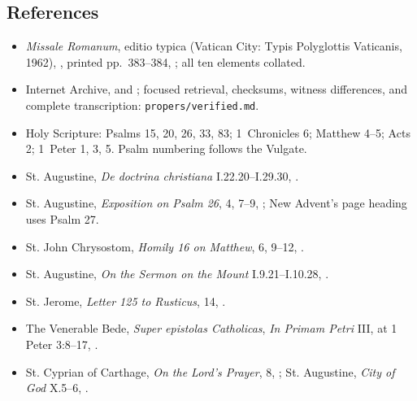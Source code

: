 \begin{deepstudy}
\section*{References}
{\footnotesize
\begin{itemize}[itemsep=0em,topsep=0.15em,parsep=0pt]
\item \emph{Missale Romanum}, editio typica (Vatican City: Typis Polyglottis Vaticanis, 1962), , printed pp.~383--384, ; all ten elements collated.
\item Internet Archive,  and ; focused retrieval, checksums, witness differences, and complete transcription: \nolinkurl{propers/verified.md}.
\item Holy Scripture: Psalms 15, 20, 26, 33, 83; 1~Chronicles 6; Matthew 4--5; Acts 2; 1~Peter 1, 3, 5. Psalm numbering follows the Vulgate.
\item St. Augustine, \emph{De doctrina christiana} I.22.20--I.29.30, .
\item St. Augustine, \emph{Exposition on Psalm 26}, 4, 7--9, ; New Advent's page heading uses Psalm 27.
\item St. John Chrysostom, \emph{Homily 16 on Matthew}, 6, 9--12, .
\item St. Augustine, \emph{On the Sermon on the Mount} I.9.21--I.10.28, .
\item St. Jerome, \emph{Letter 125 to Rusticus}, 14, .
\item The Venerable Bede, \emph{Super epistolas Catholicas}, \emph{In Primam Petri} III, at 1 Peter 3:8--17, .
\item St. Cyprian of Carthage, \emph{On the Lord's Prayer}, 8, ; St. Augustine, \emph{City of God} X.5--6, .

\end{itemize}}
\end{deepstudy}
